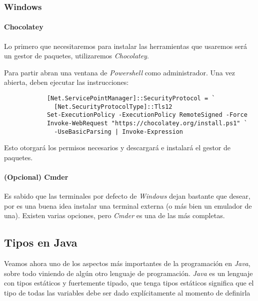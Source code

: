       \subsubsection{Windows}
        \paragraph{Chocolatey}
          Lo primero que necesitaremos para instalar las herramientas que usaremos será un gestor de 
          paquetes, utilizaremos \textit{Chocolatey}.\autocite{choco}

          Para partir abran una ventana de \textit{Powershell} como administrador.
          Una vez abierta, deben ejecutar las instrucciones:
          \begin{verbatim}
            [Net.ServicePointManager]::SecurityProtocol = `
              [Net.SecurityProtocolType]::Tls12
            Set-ExecutionPolicy -ExecutionPolicy RemoteSigned -Force
            Invoke-WebRequest "https://chocolatey.org/install.ps1" `
              -UseBasicParsing | Invoke-Expression
          \end{verbatim}

          Esto otorgará los permisos necesarios y descargará e instalará el gestor de paquetes.
        \paragraph{(Opcional) Cmder}
          Es sabido que las terminales por defecto de \textit{Windows} dejan bastante que desear, 
          por es una buena idea instalar una terminal externa (o más bien un emulador de una).
          Existen varias opciones, pero \textit{Cmder} es una de las más completas.
          


    \subsection{Tipos en Java}
      Veamos ahora uno de los aspectos más importantes de la programación en \textit{Java}, sobre todo
      viniendo de algún otro lenguaje de programación.
      \textit{Java} es un lenguaje con tipos estáticos y fuertemente tipado, que tenga tipos estáticos
      significa que el tipo de todas las variables debe ser dado explícitamente al momento de 
      definirla

  \nocite{*}
  \printbibliography[keyword=Por_algo_se_empieza]

